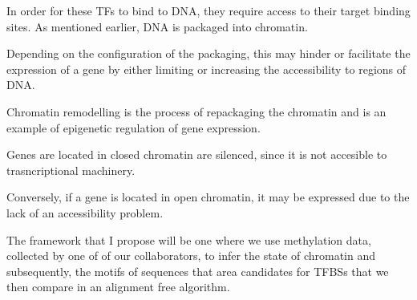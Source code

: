         In order for these TFs to bind to DNA, they require access to their target binding sites. As mentioned earlier, DNA is packaged into chromatin. 

        Depending on the configuration of the packaging, this may hinder or facilitate the expression of a gene by either limiting or increasing the accessibility to regions of DNA. 

        Chromatin remodelling is the process of repackaging the chromatin and is an example of epigenetic regulation of gene expression. 

        Genes are located in closed chromatin are silenced, since it is not accesible to trasncriptional machinery. 

        Conversely, if a gene is located in open chromatin, it may be expressed due to the lack of an accessibility problem.
    	
        The framework that I propose will be one where we use methylation data, collected by one of of our collaborators, to infer the state of chromatin and subsequently, the motifs of sequences that area candidates for TFBSs that we then compare in an alignment free algorithm.

        
        
        
        
